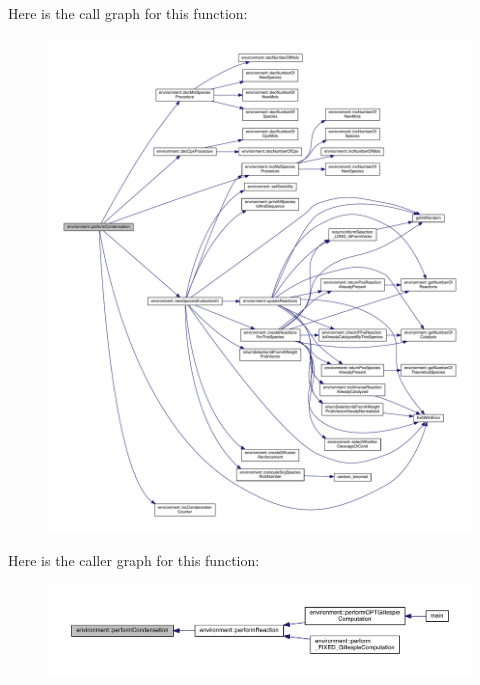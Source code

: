 Here is the call graph for this function\-:\nopagebreak
\begin{figure}[H]
\begin{center}
\leavevmode
\includegraphics[width=350pt]{a00014_a1baf5512b7e0a8fb6f8f890ba9f99cd1_cgraph}
\end{center}
\end{figure}




Here is the caller graph for this function\-:\nopagebreak
\begin{figure}[H]
\begin{center}
\leavevmode
\includegraphics[width=350pt]{a00014_a1baf5512b7e0a8fb6f8f890ba9f99cd1_icgraph}
\end{center}
\end{figure}


